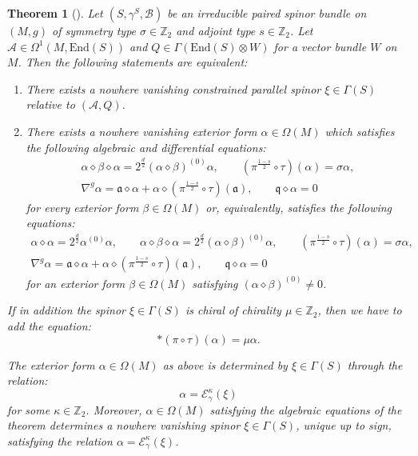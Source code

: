\documentclass[10pt,reqno]{amsart}
\newtheorem{theorem}{Theorem}[section]
\theoremstyle{definition}
\theoremstyle{remark}
\newcommand{\Z}{\mathbb{Z}}
\newcommand{\End}{\mathrm{End}}
\begin{document}
\begin{theorem}[{\cite[Thm.\ 4.26]{Cortes_Lazaroiu_Shahbazi2021}}]\label{thm:characterizaton_constrained_parallel_spinors}
    Let $(S,\gamma^S,\mathscr{B})$ be an irreducible paired spinor bundle on $(M,g)$ of symmetry type $\sigma\in\Z_2$ and adjoint type $s\in\Z_2$. Let $\mathcal{A}\in\Omega^1(M,\End(S))$ and $Q\in\Gamma(\End(S)\otimes W)$ for a vector bundle $W$ on $M$. Then the following statements are equivalent: \begin{enumerate}
        \item There exists a nowhere vanishing constrained parallel spinor $\xi\in\Gamma(S)$ relative to $(\mathcal{A},Q)$.
        \item There exists a nowhere vanishing exterior form $\alpha\in\Omega(M)$ which satisfies the following algebraic and differential equations: \begin{gather*}
            \alpha\diamond\beta\diamond\alpha=2^{\frac{d}{2}}(\alpha\diamond\beta)^{(0)}\alpha,\qquad(\pi^{\frac{1-s}{2}}\circ\tau)(\alpha)=\sigma\alpha,\\
            \nabla^g\alpha=\mathfrak{a}\diamond\alpha+\alpha\diamond(\pi^\frac{1-s}{2}\circ\tau)(\mathfrak{a}),\qquad \mathfrak{q}\diamond\alpha=0
        \end{gather*} for every exterior form $\beta\in\Omega(M)$ or, equivalently, satisfies the following equations: \begin{gather*}
            \alpha\diamond\alpha=2^{\frac{d}{2}}\alpha^{(0)}\alpha,\qquad\alpha\diamond\beta\diamond\alpha=2^{\frac{d}{2}}(\alpha\diamond\beta)^{(0)}\alpha,\qquad(\pi^{\frac{1-s}{2}}\circ\tau)(\alpha)=\sigma\alpha,\\
            \nabla^g\alpha=\mathfrak{a}\diamond\alpha+\alpha\diamond(\pi^\frac{1-s}{2}\circ\tau)(\mathfrak{a}),\qquad \mathfrak{q}\diamond\alpha=0
        \end{gather*} for an exterior form $\beta\in\Omega(M)$ satisfying $(\alpha\diamond\beta)^{(0)}\neq0$.
    \end{enumerate}

    If in addition the spinor $\xi\in\Gamma(S)$ is chiral of chirality $\mu\in\Z_2$, then we have to add the equation: $$*(\pi\circ\tau)(\alpha)=\mu\alpha.$$
    
    The exterior form $\alpha\in\Omega(M)$ as above is determined by $\xi\in\Gamma(S)$ through the relation: $$\alpha=\mathcal{E}^\kappa_\gamma(\xi)$$ for some $\kappa\in\Z_2$. Moreover, $\alpha\in\Omega(M)$ satisfying the algebraic equations of the theorem determines a nowhere vanishing spinor $\xi\in\Gamma(S)$, unique up to sign, satisfying the relation $\alpha=\mathcal{E}^\kappa_\gamma(\xi)$.
\end{theorem}
\end{document}
